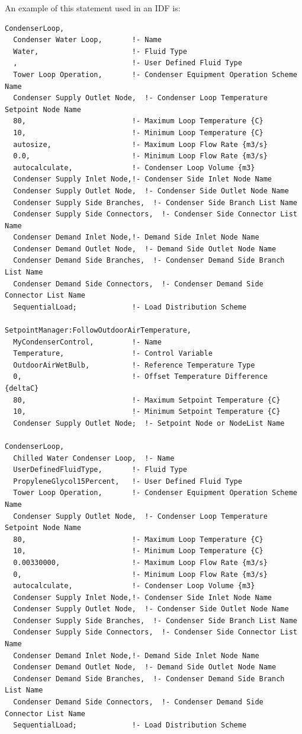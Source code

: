 An example of this statement used in an IDF is:

\begin{lstlisting}
CondenserLoop,
  Condenser Water Loop,       !- Name
  Water,                      !- Fluid Type
  ,                           !- User Defined Fluid Type
  Tower Loop Operation,       !- Condenser Equipment Operation Scheme Name
  Condenser Supply Outlet Node,  !- Condenser Loop Temperature Setpoint Node Name
  80,                         !- Maximum Loop Temperature {C}
  10,                         !- Minimum Loop Temperature {C}
  autosize,                   !- Maximum Loop Flow Rate {m3/s}
  0.0,                        !- Minimum Loop Flow Rate {m3/s}
  autocalculate,              !- Condenser Loop Volume {m3}
  Condenser Supply Inlet Node,!- Condenser Side Inlet Node Name
  Condenser Supply Outlet Node,  !- Condenser Side Outlet Node Name
  Condenser Supply Side Branches,  !- Condenser Side Branch List Name
  Condenser Supply Side Connectors,  !- Condenser Side Connector List Name
  Condenser Demand Inlet Node,!- Demand Side Inlet Node Name
  Condenser Demand Outlet Node,  !- Demand Side Outlet Node Name
  Condenser Demand Side Branches,  !- Condenser Demand Side Branch List Name
  Condenser Demand Side Connectors,  !- Condenser Demand Side Connector List Name
  SequentialLoad;             !- Load Distribution Scheme

SetpointManager:FollowOutdoorAirTemperature,
  MyCondenserControl,         !- Name
  Temperature,                !- Control Variable
  OutdoorAirWetBulb,          !- Reference Temperature Type
  0,                          !- Offset Temperature Difference {deltaC}
  80,                         !- Maximum Setpoint Temperature {C}
  10,                         !- Minimum Setpoint Temperature {C}
  Condenser Supply Outlet Node;  !- Setpoint Node or NodeList Name

CondenserLoop,
  Chilled Water Condenser Loop,  !- Name
  UserDefinedFluidType,       !- Fluid Type
  PropyleneGlycol15Percent,   !- User Defined Fluid Type
  Tower Loop Operation,       !- Condenser Equipment Operation Scheme Name
  Condenser Supply Outlet Node,  !- Condenser Loop Temperature Setpoint Node Name
  80,                         !- Maximum Loop Temperature {C}
  10,                         !- Minimum Loop Temperature {C}
  0.00330000,                 !- Maximum Loop Flow Rate {m3/s}
  0,                          !- Minimum Loop Flow Rate {m3/s}
  autocalculate,              !- Condenser Loop Volume {m3}
  Condenser Supply Inlet Node,!- Condenser Side Inlet Node Name
  Condenser Supply Outlet Node,  !- Condenser Side Outlet Node Name
  Condenser Supply Side Branches,  !- Condenser Side Branch List Name
  Condenser Supply Side Connectors,  !- Condenser Side Connector List Name
  Condenser Demand Inlet Node,!- Demand Side Inlet Node Name
  Condenser Demand Outlet Node,  !- Demand Side Outlet Node Name
  Condenser Demand Side Branches,  !- Condenser Demand Side Branch List Name
  Condenser Demand Side Connectors,  !- Condenser Demand Side Connector List Name
  SequentialLoad;             !- Load Distribution Scheme
\end{lstlisting}

